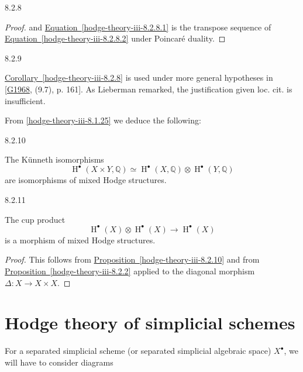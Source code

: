 \begin{corollary}{8.2.8}
\begin{proof}
      and \hyperref[hodge-theory-iii-8.2.8.1]{Equation~\ref*{hodge-theory-iii-8.2.8.1}} is the transpose sequence of \hyperref[hodge-theory-iii-8.2.8.2]{Equation~\ref*{hodge-theory-iii-8.2.8.2}} under Poincaré duality.\end{proof}\end{corollary}\begin{remark}{8.2.9}\label{hodge-theory-iii-8.2.9}\skipsinglepar\par{}\hyperref[hodge-theory-iii-8.2.8]{Corollary~\ref*{hodge-theory-iii-8.2.8}} is used under more general hypotheses in [\hyperref[G1968]{G1968}, (9.7), p. 161].
    As Lieberman remarked, the justification given loc. cit. is insufficient.\end{remark}\par{}From \cref{hodge-theory-iii-8.1.25} we deduce the following:\begin{proposition}{8.2.10}\label{hodge-theory-iii-8.2.10}\skipsinglepar\par{}The Künneth isomorphisms
    \[       \operatorname {H}^\bullet (X\times  Y,\mathbb {Q})       \simeq  \operatorname {H}^\bullet (X,\mathbb {Q})\otimes \operatorname {H}^\bullet (Y,\mathbb {Q})     \]
    are isomorphisms of mixed Hodge structures.\end{proposition}\begin{corollary}{8.2.11}\label{hodge-theory-iii-8.2.11}\skipsinglepar\par{}The cup product
    \[       \operatorname {H}^\bullet (X)\otimes \operatorname {H}^\bullet (X)       \to  \operatorname {H}^\bullet (X)     \]
    is a morphism of mixed Hodge structures.\begin{proof}\par{}This follows from \hyperref[hodge-theory-iii-8.2.10]{Proposition~\ref*{hodge-theory-iii-8.2.10}} and from \hyperref[hodge-theory-iii-8.2.2]{Proposition~\ref*{hodge-theory-iii-8.2.2}} applied to the diagonal morphism \(\Delta \colon  X\to  X\times  X\).\end{proof}\end{corollary}\section{Hodge theory of simplicial schemes}\label{hodge-theory-iii-8.3}\label{hodge-theory-iii-8.3.1}\par{}For a separated simplicial scheme (or separated simplicial algebraic space) \(X^\bullet \), we will have to consider diagrams

